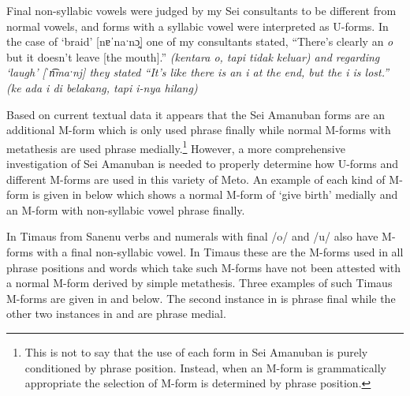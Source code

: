 Final non-syllabic vowels were judged by my Se{\Q}i consultants
to be different from normal vowels, and forms
with a syllabic vowel were interpreted as U-forms.
In the case of  `braid' [nɐˈnaˑnɔ̯]
 one of my consultants stated,
``There's clearly an \emph{o} but it doesn't leave [the mouth].''
\it{(kentara \emph{o}, tapi tidak keluar)}
and regarding  `laugh' [ˈn͡maˑnj] 
they stated ``It's like there is an \emph{i}
at the end, but the \emph{i} is lost.'' \it{(ke ada \emph{i}
di belakang, tapi \emph{i}-nya hilang})

Based on current textual data it appears that the
Se{\Q}i Amanuban forms are an additional M-form
which is only used phrase finally while normal M-forms with
metathesis are used phrase medially.\footnote{
		This is not to say that the use of each
		form in Se{\Q}i Amanuban is purely conditioned
		by phrase position. Instead, when an M-form is
		grammatically appropriate the selection of M-form
		is determined by phrase position.}
However, a more comprehensive investigation of Se{\Q}i Amanuban
is needed to properly determine how U-forms and
different M-forms are used in this variety of Meto.
An example of each kind of M-form is given in
 below which shows a
normal M-form of  `give birth'
medially and an M-form with non-syllabic vowel
phrase finally.

\begin{exe}
	\label{ex:NB-171026-4, 0.56}
\end{exe}

In Timaus from Sanenu verbs and numerals with final /o/
and /u/ also have M-forms with a final non-syllabic vowel.
In Timaus these are the M-forms used in all phrase positions
and words which take such M-forms have
not been attested with a normal M-form derived by simple metathesis.
Three examples of such Timaus M-forms are
given in  and
 below.
The second instance in  is phrase
final while the other two instances in 
and  are phrase medial.

